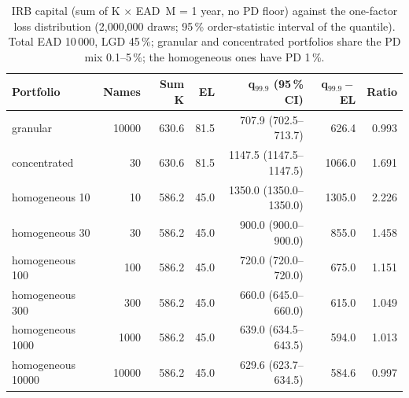 \begin{table}[H]
\centering
\scriptsize
\caption{IRB capital (sum of K $\times$ EAD\, M = 1 year, no PD floor) against the one-factor loss distribution (2,000,000 draws; 95\,\% order-statistic interval of the quantile). Total EAD 10\,000, LGD 45\,\%; granular and concentrated portfolios share the PD mix 0.1--5\,\%; the homogeneous ones have PD 1\,\%.}
\label{tab:C4_irb}
\setlength{\tabcolsep}{4pt}
\begin{tabular}{lrrrrrr}
\toprule
Portfolio & Names & Sum K & EL & q$_{99.9}$ (95\,\% CI) & q$_{99.9}-$EL & Ratio \\
\midrule
granular & 10000 & 630.6 & 81.5 & 707.9 (702.5--713.7) & 626.4 & 0.993 \\
concentrated & 30 & 630.6 & 81.5 & 1147.5 (1147.5--1147.5) & 1066.0 & 1.691 \\
homogeneous 10 & 10 & 586.2 & 45.0 & 1350.0 (1350.0--1350.0) & 1305.0 & 2.226 \\
homogeneous 30 & 30 & 586.2 & 45.0 & 900.0 (900.0--900.0) & 855.0 & 1.458 \\
homogeneous 100 & 100 & 586.2 & 45.0 & 720.0 (720.0--720.0) & 675.0 & 1.151 \\
homogeneous 300 & 300 & 586.2 & 45.0 & 660.0 (645.0--660.0) & 615.0 & 1.049 \\
homogeneous 1000 & 1000 & 586.2 & 45.0 & 639.0 (634.5--643.5) & 594.0 & 1.013 \\
homogeneous 10000 & 10000 & 586.2 & 45.0 & 629.6 (623.7--634.5) & 584.6 & 0.997 \\
\bottomrule
\end{tabular}
\end{table}
